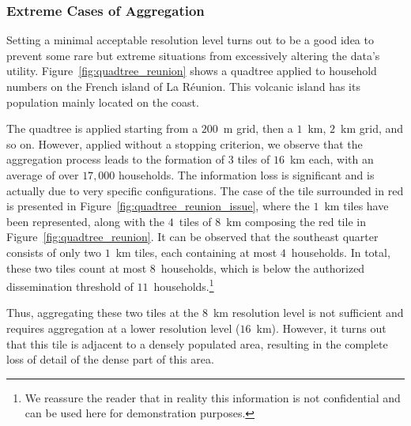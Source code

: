 \subsubsection{Extreme Cases of Aggregation}

Setting a minimal acceptable resolution level turns out to be a good idea to prevent some rare but extreme situations from excessively altering the data's utility. Figure~\ref{fig:quadtree_reunion} shows a quadtree applied to household numbers on the French island of La Réunion. This volcanic island has its population mainly located on the coast. 

The quadtree is applied starting from a $200$~m grid, then a $1$~km, $2$~km grid, and so on. However, applied without a stopping criterion, we observe that the aggregation process leads to the formation of $3$ tiles of $16$~km each, with an average of over $17,000$ households. The information loss is significant and is actually due to very specific configurations. The case of the tile surrounded in red is presented in Figure~\ref{fig:quadtree_reunion_issue}, where the $1$~km tiles have been represented, along with the $4$~tiles of $8$~km composing the red tile in Figure~\ref{fig:quadtree_reunion}. It can be observed that the southeast quarter consists of only two $1$~km tiles, each containing at most $4$~households. In total, these two tiles count at most $8$~households, which is below the authorized dissemination threshold of $11$~households.\footnote{
    We reassure the reader that in reality this information is not confidential and can be used here for demonstration purposes.}

Thus, aggregating these two tiles at the $8$~km resolution level is not sufficient and requires aggregation at a lower resolution level ($16$~km). However, it turns out that this tile is adjacent to a densely populated area, resulting in the complete loss of detail of the dense part of this area.


